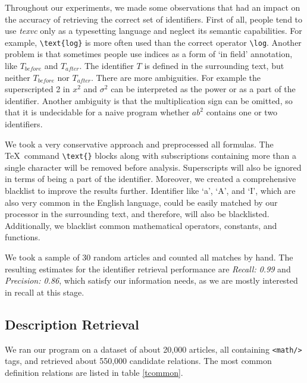 \documentclass[runningheads]{llncs}
\begin{document}
Throughout our experiments, we made some observations that had an impact on the
accuracy of retrieving the correct set of identifiers. First of all, people
tend to use \emph{texvc} only as a typesetting language and neglect its semantic capabilities. For example,
\texttt{\textbackslash text\{log\}} is more often used than the correct
operator \texttt{\textbackslash log}. Another problem is that sometimes people
use indices as a form of `in field' annotation, like $T_{before}$ and
$T_{after}$. The identifier $T$ is defined in the surrounding text, but
neither $T_{before}$ nor $T_{after}$. There are more ambiguities. For example
the superscripted 2 in $x^{2}$ and $\sigma^{2}$ can be interpreted as the
power or as a part of the identifier. Another ambiguity is that the
multiplication sign can be omitted, so that it is undecidable for a naive
program whether $ab^{2}$ contains one or two identifiers.

We took a very conservative approach and preprocessed all formulas. The
\TeX~command \texttt{\textbackslash text\{\}} blocks along with subscriptions
containing more than a single character will be removed before analysis.
Superscripts will also be ignored in terms of being a part of the identifier.
Moreover, we created a comprehensive blacklist to improve the results further.
Identifier like `a', `A', and `I', which are also very common in the English
language, could be easily matched by our processor in the surrounding text,
and therefore, will also be blacklisted. Additionally, we blacklist common
mathematical operators, constants, and functions.

We took a sample of 30 random articles and counted all matches by hand. The
resulting estimates for the identifier retrieval performance are
\emph{Recall: 0.99} and \emph{Precision: 0.86}, which satisfy our information
needs, as we are mostly interested in recall at this stage.


\subsection{Description Retrieval}
We ran our program on a dataset of about 20,000 articles, all containing
\texttt{<math/>} tags, and retrieved about 550,000 candidate relations. The
most common definition relations are listed in table \ref{tcommon}.
\end{document}
